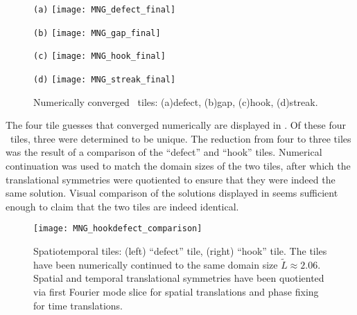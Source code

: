 \begin{figure} %
\centering
\begin{minipage}[height=.15\textheight]{.15\textwidth}
\centering \small{\texttt{(a)}}
\texttt{[image: MNG\_defect\_final]}
\end{minipage}
\begin{minipage}[height=.15\textheight]{.15\textwidth}
\centering \small{\texttt{(b)}}
\texttt{[image: MNG\_gap\_final]}
\end{minipage}
\begin{minipage}[height=.15\textheight]{.15\textwidth}
\centering \small{\texttt{(c)}}
\texttt{[image: MNG\_hook\_final]}
\end{minipage}
\begin{minipage}[height=.15\textheight]{.15\textwidth}
\centering \small{\texttt{(d)}}
\texttt{[image: MNG\_streak\_final]}
\end{minipage}
\caption{ \label{fig:MNGsubdomainfinal}
Numerically converged \spt\ tiles:
(a)defect, (b)gap, (c)hook, (d)streak.
}
\end{figure}

The four tile guesses that converged numerically
are displayed in .
Of these four \spt\ tiles, three were determined to be unique.
The reduction from four to three tiles was the result of a
comparison of the ``defect'' and ``hook'' tiles. Numerical continuation was used to match the
domain sizes of the two tiles, after which the translational symmetries were
quotiented to ensure that they were indeed the same solution.
Visual comparison of the solutions displayed in 
seems sufficient enough to claim that the two tiles are indeed identical.

\begin{figure} %
\centering
\begin{minipage}[height=.45\textheight]{.45\textwidth}
\texttt{[image: MNG\_hookdefect\_comparison]}
\end{minipage}
\caption{ \label{fig:MNGhookdefectcomparison}
Spatiotemporal tiles: (left) ``defect'' tile, (right) ``hook'' tile. The tiles have been
 numerically continued to the same domain size $\tilde{L} \approx
2.06 $. Spatial and temporal translational symmetries have been
quotiented via first Fourier mode slice for spatial
translations
and phase fixing for time translations.
}
\end{figure}

